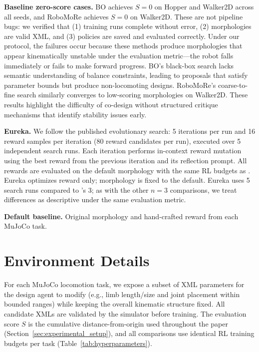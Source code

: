 \textbf{Baseline zero-score cases.} BO achieves $S{=}0$ on Hopper and Walker2D across all seeds, and RoboMoRe achieves $S{=}0$ on Walker2D. These are not pipeline bugs: we verified that (1) training runs complete without error, (2) morphologies are valid XML, and (3) policies are saved and evaluated correctly. Under our protocol, the failures occur because these methods produce morphologies that appear kinematically unstable under the evaluation metric---the robot falls immediately or fails to make forward progress. BO's black-box search lacks semantic understanding of balance constraints, leading to proposals that satisfy parameter bounds but produce non-locomoting designs. RoboMoRe's coarse-to-fine search similarly converges to low-scoring morphologies on Walker2D. These results highlight the difficulty of co-design without structured critique mechanisms that identify stability issues early.

\textbf{Eureka.} We follow the published evolutionary search: 5 iterations per run and 16 reward samples per iteration (80 reward candidates per run), executed over 5 independent search runs. Each iteration performs in-context reward mutation using the best reward from the previous iteration and its reflection prompt. All rewards are evaluated on the default morphology with the same RL budgets as \abbrev{}. Eureka optimizes reward only; morphology is fixed to the default. Eureka uses 5 search runs compared to \abbrev{}'s 3; as with the other $n{=}3$ comparisons, we treat differences as descriptive under the same evaluation metric.

\textbf{Default baseline.} Original morphology and hand-crafted reward from each MuJoCo task.

\section{Environment Details}
\label{app:environments}
For each MuJoCo locomotion task, we expose a subset of XML parameters for the design agent to modify (e.g., limb length/size and joint placement within bounded ranges) while keeping the overall kinematic structure fixed. All candidate XMLs are validated by the simulator before training. The evaluation score $S$ is the cumulative distance-from-origin used throughout the paper (Section~\ref{sec:experimental_setup}), and all comparisons use identical RL training budgets per task (Table~\ref{tab:hyperparameters}).

